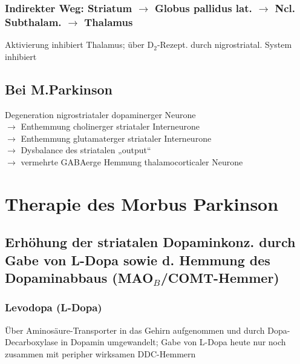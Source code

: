 \documentclass[10pt,a4paper]{report}
\begin{document}
\subsubsection{Indirekter Weg: Striatum $\rightarrow$ Globus pallidus lat. $\rightarrow$ Ncl. Subthalam. $\rightarrow$ Thalamus} %
\label{ssub:indirekter_weg_striatum_globus_pallidus_lat_ncl_subthalam_thalamus}
Aktivierung inhibiert Thalamus; über D$_2$-Rezept. durch nigrostriatal. System inhibiert
\subsection{Bei M.Parkinson} %
\label{sub:bei_m_parkinson}
Degeneration nigrostriataler dopaminerger Neurone\\
$\rightarrow$ Enthemmung cholinerger striataler Interneurone\\
$\rightarrow$ Enthemmung glutamaterger striataler Interneurone\\
$\rightarrow$ Dysbalance des striatalen „output“\\
$\rightarrow$ vermehrte GABAerge Hemmung thalamocorticaler Neurone
\section{Therapie des Morbus Parkinson} %
\label{sec:therapie_des_morbus_parkinson}
\subsection{Erhöhung der striatalen Dopaminkonz. durch Gabe von L-Dopa 
  sowie d. Hemmung des Dopaminabbaus (MAO$_B$/COMT-Hemmer)} %
\label{sub:erh_hung_der_striatalen_dopaminkonz_durch_gabe_von_l_dopa_sowie_d_hemmung_des_dopaminabbaus_mao__b_comt_hemmer_}
\subsubsection{Levodopa (L-Dopa)} %
\label{ssub:levodopa_}
Über Aminosäure-Transporter in das Gehirn aufgenommen und durch Dopa-
Decarboxylase in Dopamin umgewandelt; Gabe von L-Dopa heute nur noch zusammen mit peripher wirksamen DDC-Hemmern
\end{document}
